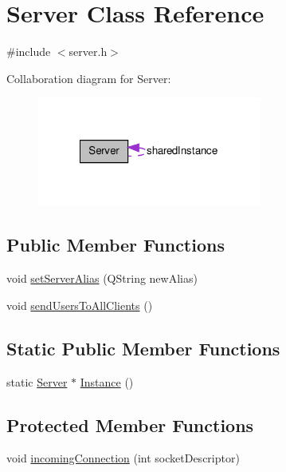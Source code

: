 \hypertarget{class_server}{
\section{Server Class Reference}
\label{class_server}
}


{\ttfamily \#include $<$server.h$>$}



Collaboration diagram for Server:\nopagebreak
\begin{figure}[H]
\begin{center}
\leavevmode
\includegraphics[width=209pt]{class_server__coll__graph}
\end{center}
\end{figure}
\subsection*{Public Member Functions}
\begin{DoxyCompactItemize}
\item 
void \hyperlink{class_server_af6867f3b0e768ecdfa4cca2755a6a60b}{setServerAlias} (QString newAlias)
\item 
void \hyperlink{class_server_a55398b8dffc88e16f03be9afe72d8b09}{sendUsersToAllClients} ()
\end{DoxyCompactItemize}
\subsection*{Static Public Member Functions}
\begin{DoxyCompactItemize}
\item 
static \hyperlink{class_server}{Server} $\ast$ \hyperlink{class_server_a319f8da4a27ca0b79f37c3d741336464}{Instance} ()
\end{DoxyCompactItemize}
\subsection*{Protected Member Functions}
\begin{DoxyCompactItemize}
\item 
void \hyperlink{class_server_a48091e8b382412a1f63f05f4cc0ad599}{incomingConnection} (int socketDescriptor)
\end{DoxyCompactItemize}


